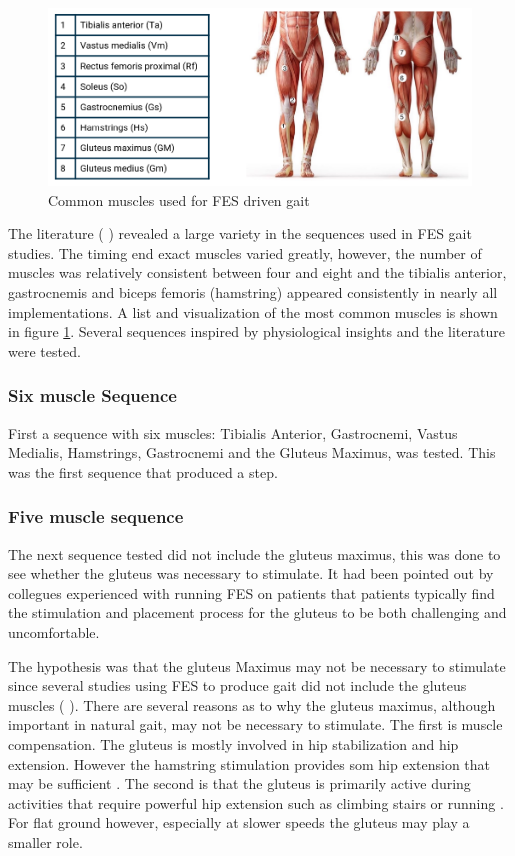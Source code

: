 \begin{figure} [h]
    \centering
    \includegraphics[width=0.85\linewidth]{images/common_muscles.png}
    \caption{Common muscles used for FES driven gait}
    \label{fig:commonMuscles}
\end{figure}

The literature ( ) revealed a large variety in the sequences used in FES gait studies. The timing end exact muscles varied greatly, however, the number of muscles was relatively consistent between four and eight and the tibialis anterior, gastrocnemis and biceps femoris (hamstring) appeared consistently in nearly all implementations. A list and visualization of the most common muscles is shown in figure \ref{fig:commonMuscles}. Several sequences inspired by physiological insights and the literature were tested. 
\newline \newline


\subsubsection{Six muscle Sequence}

First a sequence with six muscles: Tibialis Anterior, Gastrocnemi, Vastus Medialis, Hamstrings, Gastrocnemi and the Gluteus Maximus, was tested. This was the first sequence that produced a step. 

\subsubsection{Five muscle sequence}
The next sequence tested did not include the gluteus maximus, this was done to see whether the gluteus was necessary to stimulate. It had been pointed out by collegues experienced with running FES on patients that patients typically find the stimulation and placement process for the gluteus to be both challenging and uncomfortable. 

The hypothesis was that the gluteus Maximus may not be necessary to stimulate since several studies using FES to produce gait did not include the gluteus muscles ( \cite{aout_effects_2023} ). There are several reasons as to why the gluteus maximus, although important in natural gait, may not be necessary to stimulate. The first is muscle compensation. The gluteus is mostly involved in hip stabilization and hip extension. However the hamstring stimulation provides som hip extension that may be sufficient . The second is that the gluteus is primarily active during activities that require powerful hip extension such as climbing stairs or running . For flat ground however, especially at slower speeds the gluteus may play a smaller role. 

